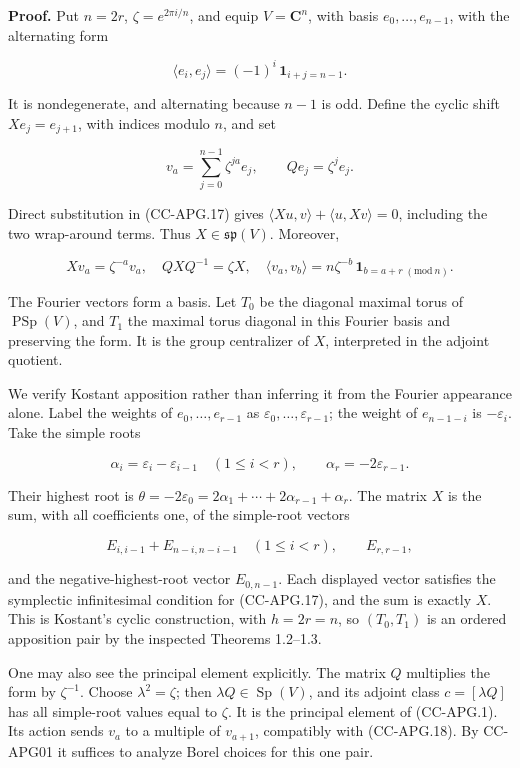 \documentclass[11pt,a4paper]{article}
\theoremstyle{definition}\newtheorem{definition}[theorem]{Definition}
\theoremstyle{remark}\newtheorem{remark}[theorem]{Remark}
\begin{document}
\textbf{Proof.} Put \(n=2r\), \(\zeta=e^{2\pi i/n}\), and equip
\(V=\mathbf C^n\), with basis \(e_0,\ldots,e_{n-1}\), with the
alternating form

\[
 \langle e_i,e_j\rangle=(-1)^i\,\mathbf 1_{i+j=n-1}.
 \tag{CC-APG.17}
\]

It is nondegenerate, and alternating because \(n-1\) is odd. Define the
cyclic shift \(X e_j=e_{j+1}\), with indices modulo \(n\), and set

\[
 v_a=\sum_{j=0}^{n-1}\zeta^{ja}e_j,\qquad
 Qe_j=\zeta^j e_j.
\]

Direct substitution in (CC-APG.17) gives
\(\langle Xu,v\rangle+\langle u,Xv\rangle=0\), including the two
wrap-around terms. Thus \(X\in\mathfrak{sp}(V)\). Moreover,

\[
 Xv_a=\zeta^{-a}v_a,\quad
 QXQ^{-1}=\zeta X,\quad
 \langle v_a,v_b\rangle
   =n\zeta^{-b}\,\mathbf 1_{b=a+r\;(\mathrm{mod}\ n)}.
 \tag{CC-APG.18}
\]

The Fourier vectors form a basis. Let \(T_0\) be the diagonal maximal
torus of \(\operatorname{PSp}(V)\), and \(T_1\) the maximal torus
diagonal in this Fourier basis and preserving the form. It is the group
centralizer of \(X\), interpreted in the adjoint quotient.

We verify Kostant apposition rather than inferring it from the Fourier
appearance alone. Label the weights of \(e_0,\ldots,e_{r-1}\) as
\(\varepsilon_0,\ldots,\varepsilon_{r-1}\); the weight of \(e_{n-1-i}\)
is \(-\varepsilon_i\). Take the simple roots

\[
 \alpha_i=\varepsilon_i-\varepsilon_{i-1}\quad(1\leq i<r),
 \qquad \alpha_r=-2\varepsilon_{r-1}.
\]

Their highest root is \(\theta=-2\varepsilon_0
=2\alpha_1+\cdots+2\alpha_{r-1}+\alpha_r\). The matrix \(X\) is the sum,
with all coefficients one, of the simple-root vectors

\[
 E_{i,i-1}+E_{n-i,n-i-1}\quad(1\leq i<r),
 \qquad E_{r,r-1},
\]

and the negative-highest-root vector \(E_{0,n-1}\). Each displayed
vector satisfies the symplectic infinitesimal condition for (CC-APG.17),
and the sum is exactly \(X\). This is Kostant's cyclic construction,
with \(h=2r=n\), so \((T_0,T_1)\) is an ordered apposition pair by the
inspected Theorems 1.2--1.3.

One may also see the principal element explicitly. The matrix \(Q\)
multiplies the form by \(\zeta^{-1}\). Choose \(\lambda^2=\zeta\); then
\(\lambda Q\in\operatorname{Sp}(V)\), and its adjoint class
\(c=[\lambda Q]\) has all simple-root values equal to \(\zeta\). It is
the principal element of (CC-APG.1). Its action sends \(v_a\) to a
multiple of \(v_{a+1}\), compatibly with (CC-APG.18). By CC-APG01 it
suffices to analyze Borel choices for this one pair.
\end{document}

